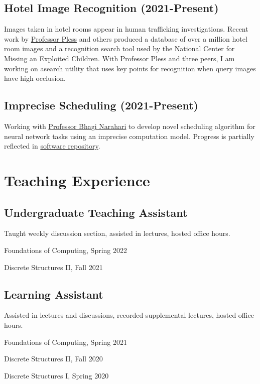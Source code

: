 \documentclass[letterpaper]{article}
\renewenvironment{itemize}{
  \begin{list}{}{
    \setlength{\leftmargin}{1.5em}
  }
}{
  \end{list}
}
\begin{document}
\subsection*{Hotel Image Recognition (2021-Present)}
Images taken in hotel rooms appear in human trafficking investigations. 
Recent work by \href{https://www2.seas.gwu.edu/~pless/}{Professor Pless} and others
produced a database of over a million hotel room images
and a recognition search tool used by the National Center for Missing an Exploited Children.
With Professor Pless and three peers, I am working
on asearch utility that uses key points for recognition when query images have high occlusion.

\subsection*{Imprecise Scheduling (2021-Present)}
Working with \href{https://www2.seas.gwu.edu/~narahari/}{Professor Bhagi Narahari} to 
develop novel scheduling algorithm for neural network tasks using an imprecise computation
model. Progress is partially reflected in 
\href{https://github.com/obroadrick/imprecise}{software repository}.

\section*{Teaching Experience}
\subsection*{Undergraduate Teaching Assistant}
Taught weekly discussion section, assisted in lectures, hosted office hours.
\begin{itemize}
\item
Foundations of Computing, Spring 2022
\item
Discrete Structures II, Fall 2021
\end{itemize}
\subsection*{Learning Assistant}
Assisted in lectures and discussions, recorded supplemental lectures, hosted office hours.
\begin{itemize}
\item
Foundations of Computing, Spring 2021
\item
Discrete Structures II, Fall 2020
\item
Discrete Structures I, Spring 2020
\end{itemize}
\end{document}
